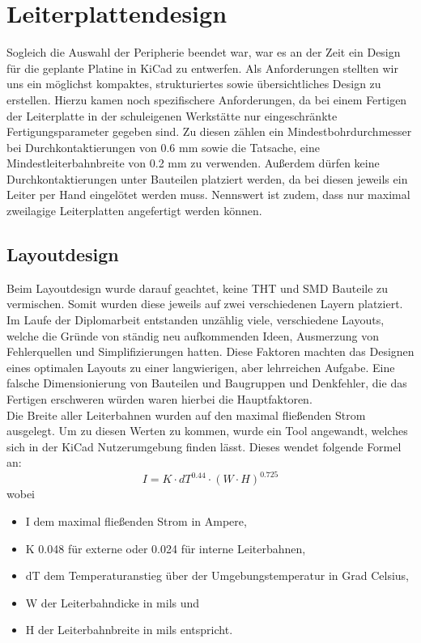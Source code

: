 
\newpage
\section{Leiterplattendesign}

Sogleich die Auswahl der Peripherie beendet war, war es an der Zeit ein Design für die geplante Platine in KiCad zu entwerfen.
Als Anforderungen stellten wir uns ein möglichst kompaktes, strukturiertes sowie übersichtliches Design zu erstellen.
Hierzu kamen noch spezifischere Anforderungen, da bei einem Fertigen der Leiterplatte in der schuleigenen Werkstätte nur eingeschränkte Fertigungsparameter gegeben sind.
Zu diesen zählen ein Mindestbohrdurchmesser bei Durchkontaktierungen von 0.6 mm sowie die Tatsache, eine Mindestleiterbahnbreite von 0.2 mm zu verwenden.
Außerdem dürfen keine Durchkontaktierungen unter Bauteilen platziert werden, da bei diesen jeweils ein Leiter per Hand eingelötet werden muss.
Nennswert ist zudem, dass nur maximal zweilagige Leiterplatten angefertigt werden können.

\subsection{Layoutdesign}

Beim Layoutdesign wurde darauf geachtet, keine THT und SMD Bauteile zu vermischen.
Somit wurden diese jeweils auf zwei verschiedenen Layern platziert. \\
Im Laufe der Diplomarbeit entstanden unzählig viele, verschiedene Layouts, welche die Gründe von ständig neu aufkommenden Ideen, Ausmerzung von Fehlerquellen und Simplifizierungen hatten.
Diese Faktoren machten das Designen eines optimalen Layouts zu einer langwierigen, aber lehrreichen Aufgabe.
Eine falsche Dimensionierung von Bauteilen und Baugruppen und Denkfehler, die das Fertigen erschweren würden waren hierbei die Hauptfaktoren. \\

Die Breite aller Leiterbahnen wurden auf den maximal fließenden Strom ausgelegt.
Um zu diesen Werten zu kommen, wurde ein Tool angewandt, welches sich in der KiCad Nutzerumgebung finden lässt.
Dieses wendet folgende Formel an: \\

\begin{equation}
    I = K \cdot dT^{0.44} \cdot (W \cdot H)^{0.725}
\end{equation}
wobei
\begin{itemize}
    \item I dem maximal fließenden Strom in Ampere,
    \item K 0.048 für externe oder 0.024 für interne Leiterbahnen,
    \item dT dem Temperaturanstieg über der Umgebungstemperatur in Grad Celsius,
    \item W der Leiterbahndicke in mils und
    \item H der Leiterbahnbreite in mils entspricht.
\end{itemize}

